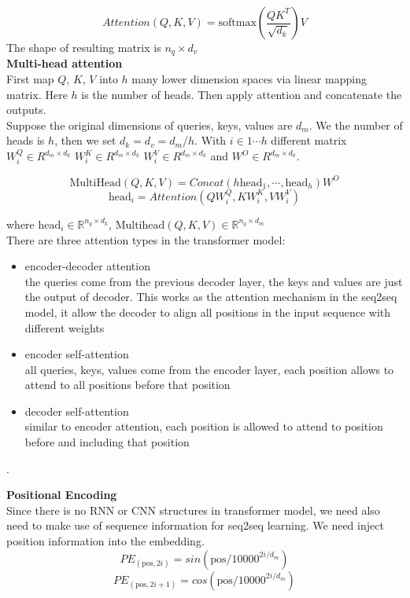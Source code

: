 \[ Attention(Q,K,V) = \text{softmax}(\frac{QK^T}{\sqrt{d_k}})V\]
The shape of resulting matrix is $n_q \times d_v$\\

\textbf{Multi-head attention}\\
 First map $Q$, $K$, $V$ into $h$ many lower dimension spaces via linear mapping matrix. Here $h$ is the number of heads. Then apply attention and concatenate the outputs. \\
Suppose the original dimensions of queries, keys, values are ${d_{m}}$. We the number of heads is ${h}$, then we set ${d_k = d_v = d_{m}/h}$. With ${i \in 1 \cdots h}$ different matrix ${W_i^Q \in R^{d_{m}\times d_k}}$ ${W_i^K \in R^{d_{m}\times d_k}}$ ${W_i^V \in R^{d_{m}\times d_k}}$ and ${W^O \in R^{d_{m}\times d_k}}$.

\[ \text{MultiHead}(Q, K, V) = Concat(h\text{head}_1, \cdots, \text{head}_h)W^O \]
\[\text{head}_i = Attention(QW_i^Q, KW_i^K, VW_i^V) \]

where  $\text{head}_i \in \mathbb{R}^{n_q \times d_k}$,  ${\text{Multihead}(Q,K,V) \in \mathbb{R}^{n_q \times d_m}}$\\


There are three attention types in the transformer model:
\begin{itemize}
	\item encoder-decoder attention\\
	the queries come from the previous decoder layer, the keys and values are just the output of decoder. This works as the attention mechanism in the seq2seq model, it allow the decoder to align all positions in the input sequence with different weights
	\item encoder self-attention\\
	all queries, keys, values come from the encoder layer, each position allows to attend to all positions before that position
	\item decoder self-attention\\
	similar to encoder attention, each position is allowed to attend to position before and including that position
\end{itemize}
.


\textbf{Positional Encoding}\\
Since there is no RNN or CNN structures in transformer model, we need also need to make use of sequence information for seq2seq learning. We need inject position information into the embedding.
\[PE_{(\text{pos}, 2i)} = sin(\text{pos}/ 10000 ^{2i / d_{m}})\]
\[ PE_{(\text{pos}, 2i+1)} = cos(\text{pos} / 10000^{2i/d_{m}})\]


